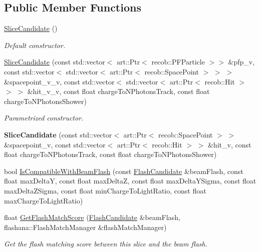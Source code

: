 \subsection*{Public Member Functions}
\begin{DoxyCompactItemize}
\item 
\hypertarget{classflashmatch_1_1FlashMatchingTool_1_1SliceCandidate_ae2d99f84ab9976ff1880906fa46427c2}{\hyperlink{classflashmatch_1_1FlashMatchingTool_1_1SliceCandidate_ae2d99f84ab9976ff1880906fa46427c2}{Slice\-Candidate} ()}\label{classflashmatch_1_1FlashMatchingTool_1_1SliceCandidate_ae2d99f84ab9976ff1880906fa46427c2}

\begin{DoxyCompactList}\small\item\em Default constructor. \end{DoxyCompactList}\item 
\hyperlink{classflashmatch_1_1FlashMatchingTool_1_1SliceCandidate_a5087a8ac4efb368f39643468585f7591}{Slice\-Candidate} (const std\-::vector$<$ art\-::\-Ptr$<$ recob\-::\-P\-F\-Particle $>$$>$ \&pfp\-\_\-v, const std\-::vector$<$ std\-::vector$<$ art\-::\-Ptr$<$ recob\-::\-Space\-Point $>$ $>$ $>$ \&spacepoint\-\_\-v\-\_\-v, const std\-::vector$<$ std\-::vector$<$ art\-::\-Ptr$<$ recob\-::\-Hit $>$ $>$ $>$ \&hit\-\_\-v\-\_\-v, const float charge\-To\-N\-Photons\-Track, const float charge\-To\-N\-Photons\-Shower)
\begin{DoxyCompactList}\small\item\em Parametrized constructor. \end{DoxyCompactList}\item 
\hypertarget{classflashmatch_1_1FlashMatchingTool_1_1SliceCandidate_a9ba86dbafd572849c898422aee9dddda}{{\bfseries Slice\-Candidate} (const std\-::vector$<$ art\-::\-Ptr$<$ recob\-::\-Space\-Point $>$ $>$ \&spacepoint\-\_\-v, const std\-::vector$<$ art\-::\-Ptr$<$ recob\-::\-Hit $>$ $>$ \&hit\-\_\-v, const float charge\-To\-N\-Photons\-Track, const float charge\-To\-N\-Photons\-Shower)}\label{classflashmatch_1_1FlashMatchingTool_1_1SliceCandidate_a9ba86dbafd572849c898422aee9dddda}

\item 
bool \hyperlink{classflashmatch_1_1FlashMatchingTool_1_1SliceCandidate_ac39549da77f9d1d2fef87dd31a01e09a}{Is\-Compatible\-With\-Beam\-Flash} (const \hyperlink{classflashmatch_1_1FlashMatchingTool_1_1FlashCandidate}{Flash\-Candidate} \&beam\-Flash, const float max\-Delta\-Y, const float max\-Delta\-Z, const float max\-Delta\-Y\-Sigma, const float max\-Delta\-Z\-Sigma, const float min\-Charge\-To\-Light\-Ratio, const float max\-Charge\-To\-Light\-Ratio)
\item 
float \hyperlink{classflashmatch_1_1FlashMatchingTool_1_1SliceCandidate_a7c1f2eedf7f2fc763cd7d738a5ac32af}{Get\-Flash\-Match\-Score} (\hyperlink{classflashmatch_1_1FlashMatchingTool_1_1FlashCandidate}{Flash\-Candidate} \&beam\-Flash, flashana\-::\-Flash\-Match\-Manager \&flash\-Match\-Manager)
\begin{DoxyCompactList}\small\item\em Get the flash matching score between this slice and the beam flash. \end{DoxyCompactList}\end{DoxyCompactItemize}
